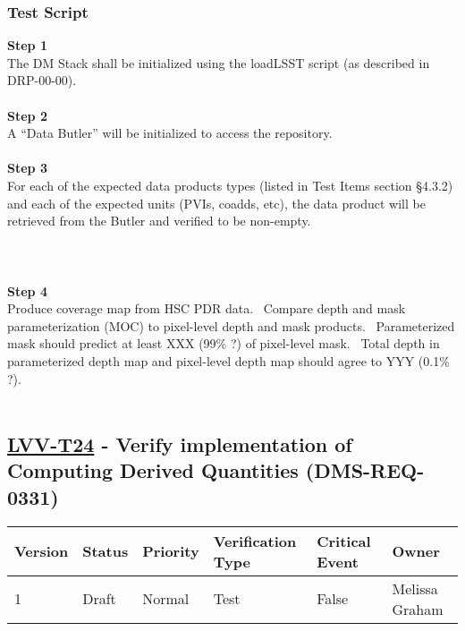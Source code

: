 \hypertarget{test-script-113}{%
\subsubsection{Test Script}\label{test-script-113}}

\textbf{Step 1}\\
The DM Stack shall be initialized using the loadLSST script (as
described in DRP-00-00).\\
~\\
\textbf{Step 2}\\
A ``Data Butler'' will be initialized to access the repository.\\
~\\
\textbf{Step 3}\\
For each of the expected data products types (listed in Test Items
section §4.3.2) and each of the expected units (PVIs, coadds, etc), the
data product will be retrieved from the Butler and verified to be
non-empty.\\
~\\
~\\
~\\
\textbf{Step 4}\\
Produce coverage map from HSC PDR data. ~Compare depth and mask
parameterization (MOC) to pixel-level depth and mask products.
~Parameterized mask should predict at least XXX (99\% ?) of pixel-level
mask. ~Total depth in parameterized depth map and pixel-level depth map
should agree to YYY (0.1\% ?).\\
~\\

\hypertarget{lvv-t24---verify-implementation-of-computing-derived-quantities-dms-req-0331}{%
\subsection{\texorpdfstring{\href{https://jira.lsstcorp.org/secure/Tests.jspa\#/testCase/LVV-T24}{LVV-T24}
- Verify implementation of Computing Derived Quantities
(DMS-REQ-0331)}{LVV-T24 - Verify implementation of Computing Derived Quantities (DMS-REQ-0331)}}\label{lvv-t24---verify-implementation-of-computing-derived-quantities-dms-req-0331}}

\begin{longtable}[]{@{}llllll@{}}
\toprule
Version & Status & Priority & Verification Type & Critical Event &
Owner\tabularnewline
\midrule
\endhead
1 & Draft & Normal & Test & False & Melissa Graham\tabularnewline
\bottomrule
\end{longtable}

